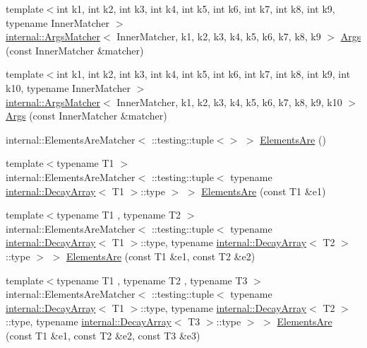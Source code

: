 \begin{DoxyCompactItemize}
{\footnotesize template$<$int k1, int k2, int k3, int k4, int k5, int k6, int k7, int k8, int k9, typename Inner\+Matcher $>$ }\\\mbox{\hyperlink{classtesting_1_1internal_1_1_args_matcher}{internal\+::\+Args\+Matcher}}$<$ Inner\+Matcher, k1, k2, k3, k4, k5, k6, k7, k8, k9 $>$ \mbox{\hyperlink{namespacetesting_a62c877e01fb9098cd3c399f921bf4e3e}{Args}} (const Inner\+Matcher \&matcher)
\item 
{\footnotesize template$<$int k1, int k2, int k3, int k4, int k5, int k6, int k7, int k8, int k9, int k10, typename Inner\+Matcher $>$ }\\\mbox{\hyperlink{classtesting_1_1internal_1_1_args_matcher}{internal\+::\+Args\+Matcher}}$<$ Inner\+Matcher, k1, k2, k3, k4, k5, k6, k7, k8, k9, k10 $>$ \mbox{\hyperlink{namespacetesting_a09ac462e8d6ed468cbfaa9c767aee0aa}{Args}} (const Inner\+Matcher \&matcher)
\item 
internal\+::\+Elements\+Are\+Matcher$<$ \+::testing\+::tuple$<$$>$ $>$ \mbox{\hyperlink{namespacetesting_a79cf4ae694bf8231dcf283b325405f27}{Elements\+Are}} ()
\item 
{\footnotesize template$<$typename T1 $>$ }\\internal\+::\+Elements\+Are\+Matcher$<$ \+::testing\+::tuple$<$ typename \mbox{\hyperlink{structtesting_1_1internal_1_1_decay_array}{internal\+::\+Decay\+Array}}$<$ T1 $>$\+::type $>$ $>$ \mbox{\hyperlink{namespacetesting_aa35aa6c9638d989e9f4aaa6009f60589}{Elements\+Are}} (const T1 \&e1)
\item 
{\footnotesize template$<$typename T1 , typename T2 $>$ }\\internal\+::\+Elements\+Are\+Matcher$<$ \+::testing\+::tuple$<$ typename \mbox{\hyperlink{structtesting_1_1internal_1_1_decay_array}{internal\+::\+Decay\+Array}}$<$ T1 $>$\+::type, typename \mbox{\hyperlink{structtesting_1_1internal_1_1_decay_array}{internal\+::\+Decay\+Array}}$<$ T2 $>$\+::type $>$ $>$ \mbox{\hyperlink{namespacetesting_a864f77fe7774308d4c54f1f52f9040cf}{Elements\+Are}} (const T1 \&e1, const T2 \&e2)
\item 
{\footnotesize template$<$typename T1 , typename T2 , typename T3 $>$ }\\internal\+::\+Elements\+Are\+Matcher$<$ \+::testing\+::tuple$<$ typename \mbox{\hyperlink{structtesting_1_1internal_1_1_decay_array}{internal\+::\+Decay\+Array}}$<$ T1 $>$\+::type, typename \mbox{\hyperlink{structtesting_1_1internal_1_1_decay_array}{internal\+::\+Decay\+Array}}$<$ T2 $>$\+::type, typename \mbox{\hyperlink{structtesting_1_1internal_1_1_decay_array}{internal\+::\+Decay\+Array}}$<$ T3 $>$\+::type $>$ $>$ \mbox{\hyperlink{namespacetesting_a0be8a0ad5d7461fd1da13ecac4e21e2a}{Elements\+Are}} (const T1 \&e1, const T2 \&e2, const T3 \&e3)
$$
\end{DoxyCompactItemize}

